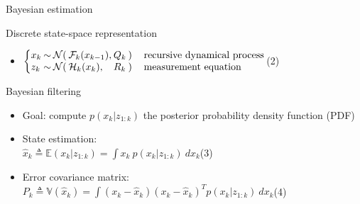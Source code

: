 \documentclass[9pt]{beamer}
\begin{document}
\begin{frame}{Bayesian estimation}

\begin{block}{Discrete state-space representation}
    \begin{itemize}
    \item\hfill$\displaystyle\setlength\arraycolsep{1pt}\left\{\begin{matrix*}[l]
    x_k&\sim&\mathcal{N}(&\mathcal{F}_k(x_{k-1}),&Q_k&)&\quad\text{recursive dynamical process}\\
    z_k&\sim&\mathcal{N}(&\mathcal{H}_k(x_k),&R_k&)&\quad\text{measurement equation}
    \end{matrix*}\right.$\hfill(2)
    \end{itemize}
\end{block}

\begin{block}{Bayesian filtering}
    \begin{itemize}
    \item Goal: compute $p(x_k|z_{1:k})$ the posterior probability density function (PDF)
    \item State estimation:\\
    \hfill$\displaystyle\hat{x}_k\triangleq\mathbb{E}(x_k|z_{1:k})=\int{x_k\:p(x_k|z_{1:k})\:dx_k}$\hfill(3)
    \item Error covariance matrix:\\
    \hfill$\displaystyle P_k\triangleq\mathbb{V}(\hat{x}_k)=\int{(x_k-\hat{x}_k)(x_k-\hat{x}_k)^Tp(x_k|z_{1:k})\:dx_k}$\hfill(4)
    \end{itemize}
\end{block}

\end{frame}
\end{document}
